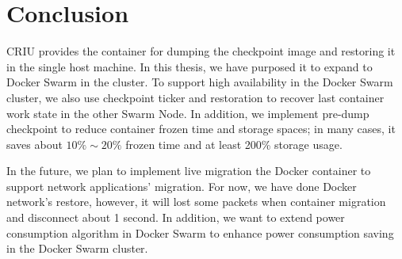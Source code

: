 \chapter{Conclusion}
\label{chap:conclusion}
CRIU provides the container for dumping the checkpoint image and restoring it in the single host machine. In this thesis, we have purposed it to expand to Docker Swarm in the cluster.
To support high availability in the Docker Swarm cluster, we also use checkpoint ticker and restoration to recover last container work state in the other Swarm Node. In addition, we implement pre-dump checkpoint to reduce container frozen time and storage spaces; in many cases, it saves about $ 10\% \sim 20\% $ frozen time and at least 200\% storage usage.

In the future, we plan to implement live migration the Docker container to support network applications' migration.
For now, we have done Docker network's restore, however, it will lost some packets when container migration and disconnect about 1 second.
In addition, we want to extend power consumption algorithm in Docker Swarm to enhance power consumption saving in the Docker Swarm cluster.